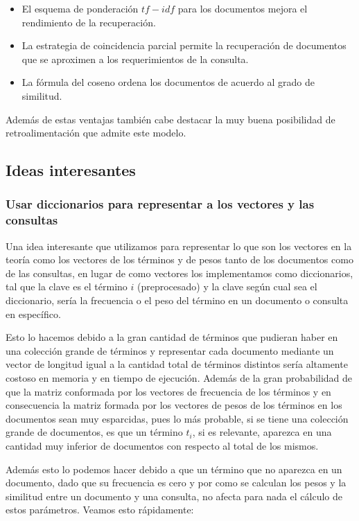 \documentclass[runningheads]{llncs}
\begin{document}
	\begin{itemize}
		\item El esquema de ponderaci\'on $tf-idf$ para los documentos mejora el rendimiento de la recuperaci\'on.
		\item La estrategia de coincidencia parcial permite la recuperaci\'on de documentos que se aproximen a los requerimientos de la consulta.
		\item La f\'ormula del coseno ordena los documentos de acuerdo al grado de similitud.
	\end{itemize}

	Adem\'as de estas ventajas tambi\'en cabe destacar la muy buena posibilidad de retroalimentaci\'on que admite este modelo.
	
	\subsection{Ideas interesantes}
	
	\subsubsection{Usar diccionarios para representar a los vectores y las consultas}
	Una idea interesante que utilizamos para representar lo que son los vectores en la teor\'ia como los vectores de los t\'erminos y de pesos tanto de los documentos como de las consultas, en lugar de como vectores los implementamos como diccionarios, tal que la clave es el t\'ermino $i$ (preprocesado) y la clave seg\'un cual sea el diccionario, ser\'ia la frecuencia o el peso del t\'ermino en un documento o consulta en espec\'ifico. 
	
	Esto lo hacemos debido a la gran cantidad de t\'erminos que pudieran haber en una colecci\'on grande de t\'erminos y representar cada documento mediante un vector de longitud igual a la cantidad total de t\'erminos distintos ser\'ia altamente costoso en memoria y en tiempo de ejecuci\'on. Adem\'as de la gran probabilidad de que la matriz conformada por los vectores de frecuencia de los t\'erminos y en consecuencia la matriz formada por los vectores de pesos de los t\'erminos en los documentos sean muy esparcidas, pues lo m\'as probable, si se tiene una colecci\'on grande de documentos, es que un t\'ermino $t_i$, si es relevante, aparezca en una cantidad muy inferior de documentos con respecto al total de los mismos.
	
	Adem\'as esto lo podemos hacer debido a que un t\'ermino que no aparezca en un documento, dado que su frecuencia es cero y por como se calculan los pesos y la similitud entre un documento y una consulta, no afecta para nada el c\'alculo de estos par\'ametros. Veamos esto r\'apidamente:
	
\end{document}
